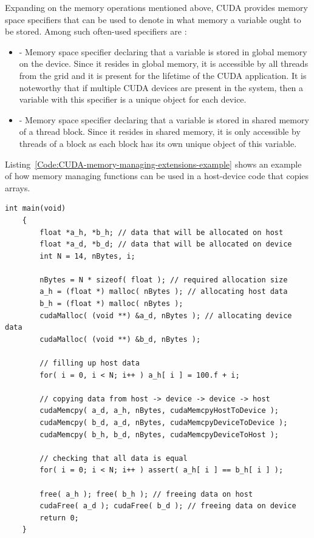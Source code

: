 Expanding on the memory operations mentioned above, CUDA provides memory space specifiers that can be used to denote in what memory a variable ought to be stored. Among such often-used specifiers are \cite{NVIDIAMay2022}:

\begin{itemize}
	\item {} - Memory space specifier declaring that a variable is stored in global memory on the device. Since it resides in global memory, it is accessible by all threads from the grid and it is present for the lifetime of the CUDA application. It is noteworthy that if multiple CUDA devices are present in the system, then a variable with this specifier is a unique object for each device.
	\item {} - Memory space specifier declaring that a variable is stored in shared memory of a thread block. Since it resides in shared memory, it is only accessible by threads of a block as each block has its own unique object of this variable.
\end{itemize}

Listing~\ref{Code:CUDA-memory-managing-extensions-example} shows an example of how memory managing functions can be used in a host-device code that copies arrays.

\begin{lstlisting}[caption= Example of code that utilizes CUDA memory managing extensions of C++. Taken from \textit{Formats for storage of sparse matrices on GPU} \cite{Cejka2020} and Nvidia's \emph{Getting Started with CUDA} presentation \cite{Ruetsch2008}.,label=Code:CUDA-memory-managing-extensions-example]
	int main(void)
	{
		float *a_h, *b_h; // data that will be allocated on host
		float *a_d, *b_d; // data that will be allocated on device
		int N = 14, nBytes, i;
		
		nBytes = N * sizeof( float ); // required allocation size
		a_h = (float *) malloc( nBytes ); // allocating host data
		b_h = (float *) malloc( nBytes ); 
		cudaMalloc( (void **) &a_d, nBytes ); // allocating device data
		cudaMalloc( (void **) &b_d, nBytes );
		
		// filling up host data
		for( i = 0, i < N; i++ ) a_h[ i ] = 100.f + i;
		
		// copying data from host -> device -> device -> host
		cudaMemcpy( a_d, a_h, nBytes, cudaMemcpyHostToDevice );
		cudaMemcpy( b_d, a_d, nBytes, cudaMemcpyDeviceToDevice );
		cudaMemcpy( b_h, b_d, nBytes, cudaMemcpyDeviceToHost );
		
		// checking that all data is equal
		for( i = 0; i < N; i++ ) assert( a_h[ i ] == b_h[ i ] );
		
		free( a_h ); free( b_h ); // freeing data on host
		cudaFree( a_d ); cudaFree( b_d ); // freeing data on device
		return 0;
	}
\end{lstlisting}

